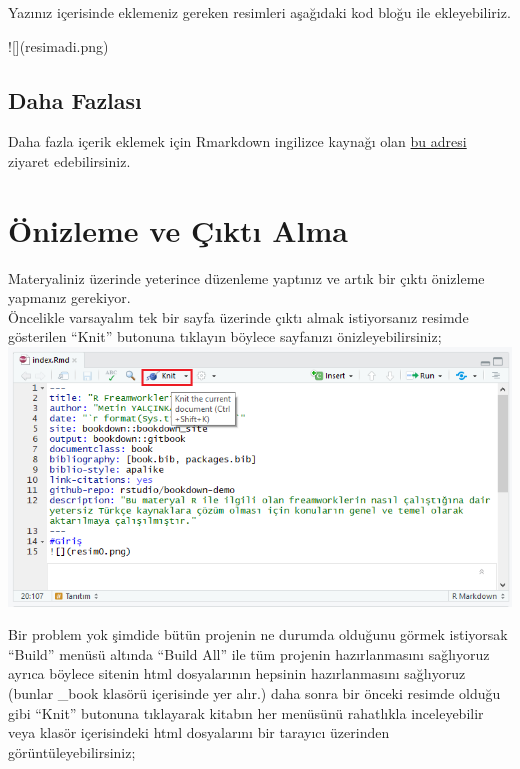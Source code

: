 \documentclass[]{book}
\newenvironment{Shaded}{\begin{snugshade}}{\end{snugshade}}
\newcommand{\NormalTok}[1]{#1}
\begin{document}
Yazınız içerisinde eklemeniz gereken resimleri aşağıdaki kod bloğu ile
ekleyebiliriz.

\begin{Shaded}
\begin{Highlighting}[]
\NormalTok{![](resimadi.png)}
\end{Highlighting}
\end{Shaded}

\subsection{Daha Fazlası}\label{daha-fazlas}

Daha fazla içerik eklemek için Rmarkdown ingilizce kaynağı olan
\href{https://rmarkdown.rstudio.com/authoring_pandoc_markdown.html\#pandoc_markdown}{bu
adresi} ziyaret edebilirsiniz.

\section{Önizleme ve Çıktı Alma}\label{onizleme-ve-ckt-alma}

Materyaliniz üzerinde yeterince düzenleme yaptınız ve artık bir çıktı
önizleme yapmanız gerekiyor.\\
Öncelikle varsayalım tek bir sayfa üzerinde çıktı almak istiyorsanız
resimde gösterilen ``Knit'' butonuna tıklayın böylece sayfanızı
önizleyebilirsiniz; \includegraphics{resim3.png}

Bir problem yok şimdide bütün projenin ne durumda olduğunu görmek
istiyorsak ``Build'' menüsü altında ``Build All'' ile tüm projenin
hazırlanmasını sağlıyoruz ayrıca böylece sitenin html dosyalarının
hepsinin hazırlanmasını sağlıyoruz (bunlar \_book klasörü içerisinde yer
alır.) daha sonra bir önceki resimde olduğu gibi ``Knit'' butonuna
tıklayarak kitabın her menüsünü rahatlıkla inceleyebilir veya klasör
içerisindeki html dosyalarını bir tarayıcı üzerinden
görüntüleyebilirsiniz;
\end{document}
